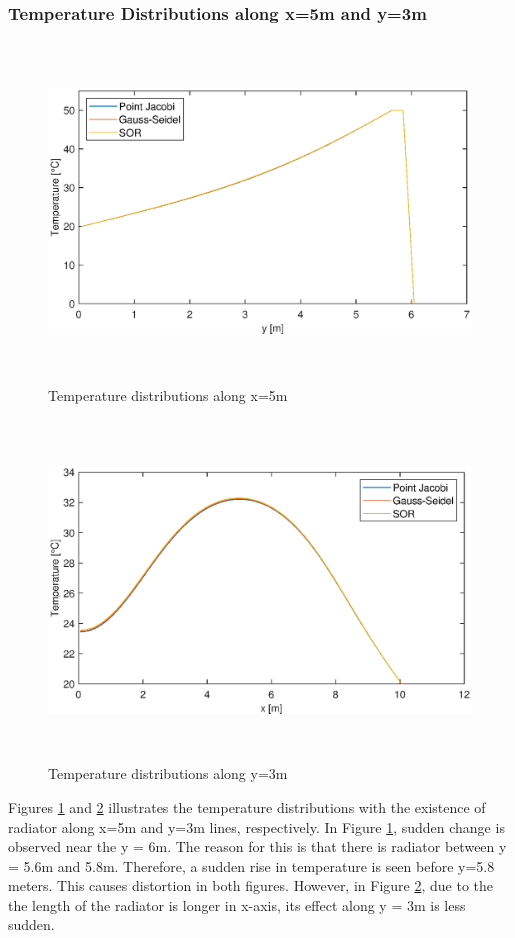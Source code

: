 \documentclass[letterpaper,12pt]{article}
\begin{document}
\subsubsection{Temperature Distributions along x=5m and y=3m}
\begin{figure}[H] 
	\centering 
	\includegraphics[max height=9cm]{graphs/x5_SOR19_defaultrad.eps}
	\caption{Temperature distributions along x=5m}
 	\label{fig:x5rad}
\end{figure}
\begin{figure}[H] 
	\centering 
	\includegraphics[max height=9cm]{graphs/y3_SOR19_defaultrad.eps}
	\caption{Temperature distributions along y=3m}
 	\label{fig:y3rad}
\end{figure}
Figures \ref{fig:x5rad} and \ref{fig:y3rad} illustrates the temperature distributions with the
existence of radiator along x=5m and y=3m lines, respectively. In Figure \ref{fig:x5rad}, sudden
change is observed near the y = 6m. The reason for this is that there is radiator between y = 5.6m
and 5.8m. Therefore, a sudden rise in temperature is seen before y=5.8 meters. This causes distortion
in both figures. However, in Figure \ref{fig:y3rad}, due to the the length of the radiator is 
longer in x-axis, its effect along y = 3m is less sudden.
\end{document}

